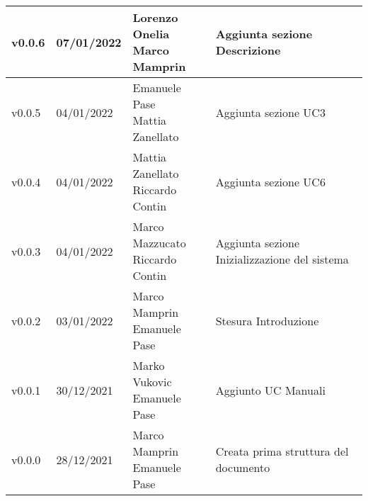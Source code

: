 \begin{center}
\begin{longtable}{|p{2cm}|p{2cm}|p{4cm}|p{5cm}|}
    v0.0.6            & 07/01/2022    & \aCapo{Lorenzo Onelia\\Marco Mamprin}      & Aggiunta sezione Descrizione                    \\ \hline
    v0.0.5            & 04/01/2022    & \aCapo{Emanuele Pase\\Mattia Zanellato}    & Aggiunta sezione UC3                            \\ \hline
    v0.0.4            & 04/01/2022    & \aCapo{Mattia Zanellato\\Riccardo Contin}  & Aggiunta sezione UC6                            \\ \hline
    v0.0.3            & 04/01/2022    & \aCapo{Marco Mazzucato\\Riccardo Contin}   & Aggiunta sezione Inizializzazione del sistema   \\ \hline
    v0.0.2            & 03/01/2022    & \aCapo{Marco Mamprin\\Emanuele Pase}       & Stesura Introduzione                            \\ \hline
    v0.0.1            & 30/12/2021    & \aCapo{Marko Vukovic\\Emanuele Pase}       & Aggiunto UC Manuali                             \\ \hline
    v0.0.0            & 28/12/2021    & \aCapo{Marco Mamprin\\Emanuele Pase}       & Creata prima struttura del documento            \\ \hline

  \end{longtable}
\end{center}
